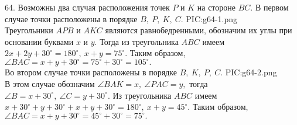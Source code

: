 64. Возможны два случая расположения точек $P$ и $K$ на стороне $BC.$ В первом случае точки расположены в порядке $B,\ P,\ K,\ C.$
{{PIC:g64-1.png}}\\
Треугольники $APB$ и $AKC$ являются равнобедренными, обозначим их углы при основании буквами $x$ и $y.$ Тогда из треугольника $ABC$ имеем $2x+2y+30^\circ=180^\circ,\ x+y=75^\circ.$ Таким образом, $\angle BAC=x+y+30^\circ=75^\circ+30^\circ=105^\circ.$\\
Во втором случае точки расположены в порядке $B,\ K,\ P,\ C.$
{{PIC:g64-2.png}}\\
В этом случае обозначим $\angle BAK=x,\ \angle PAC=y,$ тогда $\angle B=x+30^\circ,\ \angle C=y+30^\circ.$ Из треугольника $ABC$ имеем $x+30^\circ+y+30^\circ+x+y+30^\circ=180^\circ,\ x+y=45^\circ.$ Таким образом, $\angle BAC=x+y+30^\circ=45^\circ+30^\circ=75^\circ.$\\
